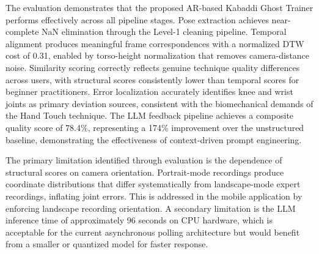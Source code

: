 \begin{sloppypar}
The evaluation demonstrates that the proposed AR-based Kabaddi Ghost Trainer performs effectively across all pipeline stages. Pose extraction achieves near-complete NaN elimination through the Level-1 cleaning pipeline. Temporal alignment produces meaningful frame correspondences with a normalized DTW cost of 0.31, enabled by torso-height normalization that removes camera-distance noise. Similarity scoring correctly reflects genuine technique quality differences across users, with structural scores consistently lower than temporal scores for beginner practitioners. Error localization accurately identifies knee and wrist joints as primary deviation sources, consistent with the biomechanical demands of the Hand Touch technique. The LLM feedback pipeline achieves a composite quality score of 78.4\%, representing a 174\% improvement over the unstructured baseline, demonstrating the effectiveness of context-driven prompt engineering.

The primary limitation identified through evaluation is the dependence of structural scores on camera orientation. Portrait-mode recordings produce coordinate distributions that differ systematically from landscape-mode expert recordings, inflating joint errors. This is addressed in the mobile application by enforcing landscape recording orientation. A secondary limitation is the LLM inference time of approximately 96 seconds on CPU hardware, which is acceptable for the current asynchronous polling architecture but would benefit from a smaller or quantized model for faster response.

\end{sloppypar}

